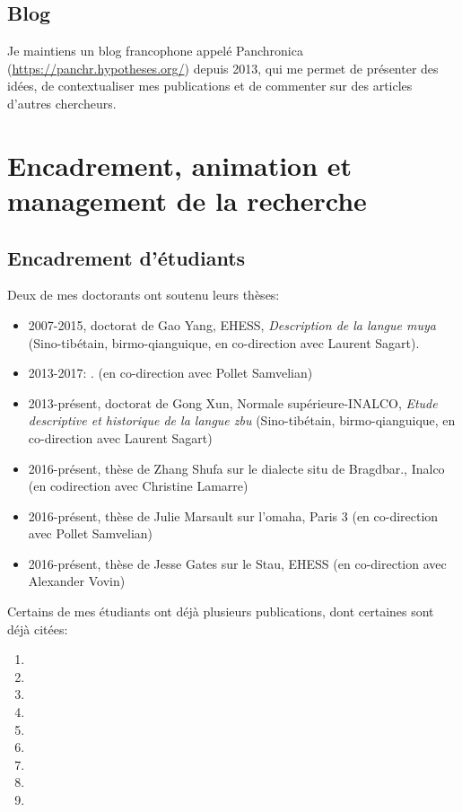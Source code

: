\documentclass[oldfontcommands,oneside,a4paper,11pt]{article}
\begin{document}
\subsection{Blog}
Je maintiens un blog francophone appelé Panchronica (\url{https://panchr.hypotheses.org/}) depuis 2013, qui me permet de présenter des idées, de contextualiser mes publications et de commenter sur des articles d'autres chercheurs.


\section{Encadrement, animation et management de la recherche}
\subsection{Encadrement d'étudiants}
Deux de mes doctorants ont soutenu leurs thèses:
\begin{itemize}
\item 2007-2015, doctorat de Gao Yang, EHESS, \textit{Description de la langue muya} (Sino-tibétain, birmo-qianguique, en co-direction avec Laurent Sagart).
\item 2013-2017: . (en co-direction avec Pollet Samvelian)
\end{itemize}

\begin{itemize}
\item 2013-présent, doctorat de Gong Xun, Normale supérieure-INALCO, \textit{Etude descriptive et historique de la langue zbu} (Sino-tibétain, birmo-qianguique, en co-direction avec Laurent Sagart)
\item 2016-présent, thèse de Zhang Shufa sur le dialecte situ de Bragdbar., Inalco (en codirection avec Christine Lamarre)
\item 2016-présent, thèse de Julie Marsault sur l'omaha, Paris 3 (en co-direction avec Pollet Samvelian)
\item 2016-présent, thèse de Jesse Gates sur le Stau, EHESS (en co-direction avec Alexander Vovin)
\end{itemize}

Certains de mes étudiants ont déjà plusieurs publications, dont certaines sont déjà citées:

\begin{enumerate}
  \item {}
  \item {}
  \item {}
  \item {}
    \item {}
    \item {}
 \item  {}
 \item  {}
 \item {} 
\end{enumerate}
\end{document}
